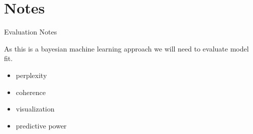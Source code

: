 \documentclass[10pt]{beamer}
\begin{document}

\section{Notes}

\begin{frame}{Evaluation Notes}

  As this is a bayesian machine learning approach we will need to evaluate model fit.

  \begin{itemize}
  \item perplexity
  \item coherence
  \item visualization
  \item predictive power
  \end{itemize}
\end{frame}
\end{document}
